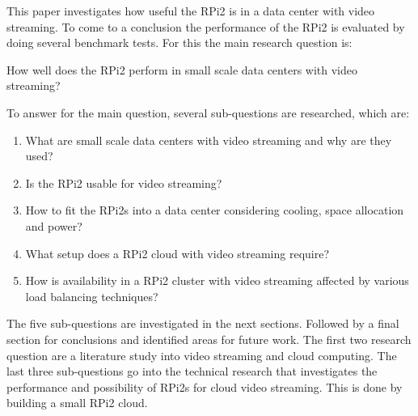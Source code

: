 \documentclass{sig-alternate-br}
\begin{document}
This paper investigates how useful the RPi2 is in a data center with video streaming. To come to a conclusion the performance of the RPi2 is evaluated by doing several benchmark tests. For this the main research question is: 
\begin{center}
How well does the RPi2 perform in small scale data centers with video streaming? 
\end{center}

To answer for the main question, several sub-questions are researched, which are:

\begin{enumerate}
	\item What are small scale data centers with video streaming and why are they used?
	\item Is the RPi2 usable for video streaming?
	\item How to fit the RPi2s into a data center considering cooling, space allocation and power?
	\item What setup does a RPi2 cloud with video streaming require?
	\item How is availability in a RPi2 cluster with video streaming affected by various load balancing techniques? 
\end{enumerate}

The five sub-questions are investigated in the next sections. Followed by a final section for conclusions and identified areas for future work.
The first two research question are a literature study into video streaming and cloud computing. The last three sub-questions go into the technical research that investigates the performance and possibility of RPi2s for cloud video streaming. This is done by building a small RPi2 cloud. 
\end{document}
